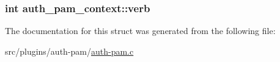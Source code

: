 \subsubsection[{verb}]{\setlength{\rightskip}{0pt plus 5cm}int auth\+\_\+pam\+\_\+context\+::verb}\label{structauth__pam__context_a443a725256c636e197fe19f1bc5d801f}


The documentation for this struct was generated from the following file\+:\begin{DoxyCompactItemize}
\item 
src/plugins/auth-\/pam/\hyperlink{auth-pam_8c}{auth-\/pam.\+c}\end{DoxyCompactItemize}
